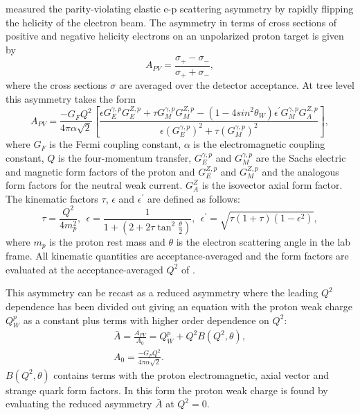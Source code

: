 \Qs measured the parity-violating elastic e-p scattering asymmetry by rapidly flipping the helicity of the electron beam. The asymmetry in terms of cross sections of positive and negative helicity electrons on an unpolarized proton target is given by
\begin{equation}
A_{PV}=\frac{\sigma_+-\sigma_-}{\sigma_++\sigma_-},
\label{eq:qw_asymmetry_cx}
\end{equation}
where the cross sections $\sigma$ are averaged over the detector acceptance. At tree level this asymmetry takes the form
\begin{equation}
A_{PV}=\frac{-G_FQ^2}{4\pi \alpha\sqrt{2}}\left[\frac{{\epsilon}G^{\gamma,p}_EG^{Z,p}_E+{\tau}G^{\gamma,p}_MG^{Z,p}_M-\left(1-4sin^2{\theta}_W\right){\epsilon}^{\prime}G^{\gamma,p}_MG^{Z,p}_A}{{\epsilon}(G^{\gamma,p}_E)^2+{\tau}(G^{\gamma,p}_M)^2} \right],
\label{eq:qw_asymmetry}
\end{equation} 
where $G_F$ is the Fermi coupling constant, $\alpha$ is the electromagnetic coupling constant, $Q$ is the four-momentum transfer, $G_E^{\gamma,p}$ and $G_M^{\gamma,p}$ are the Sachs electric and magnetic form factors of the proton and $G_E^{Z,p}$ and $G_M^{Z,p}$ and the analogous form factors for the neutral weak current. $G_A^Z$ is the isovector axial form factor. The kinematic factors $\tau$, $\epsilon$ and $\epsilon^{\prime}$ are defined as follows:
\begin{equation}
\tau=\frac{Q^2}{4m_p^2},~~\epsilon=\frac{1}{1+\left(2+2\tau\tan^2\frac{\theta}{2}\right)},~~\epsilon^{\prime}=\sqrt{\tau(1+\tau)(1-\epsilon^2)},
\label{eq:kinematic_factors}
\end{equation} 
where $m_p$ is the proton rest mass and $\theta$ is the electron scattering angle in the lab frame. All kinematic quantities are acceptance-averaged and the form factors are evaluated at the acceptance-averaged $Q^2$ of \Q.

This asymmetry can be recast as a reduced asymmetry where the leading $Q^2$ dependence has been divided out giving an equation with the proton weak charge $Q_W^p$ as a constant plus terms with higher order dependence on $Q^2$\cite{Erler2005}:
\begin{equation}
\begin{array}{c}
\bar A=\frac{A_{PV}}{A_0}=Q_W^p+Q^2B(Q^2,\theta),\\A_0=\frac{-G_FQ^2}{4\pi\alpha\sqrt{2}}.
\end{array}
\label{eq:reduced_asym}
\end{equation}
$B(Q^2,\theta)$ contains terms with the proton electromagnetic, axial vector and strange quark form factors. In this form the proton weak charge is found by evaluating the reduced asymmetry $\bar A$ at $Q^2=0$.

